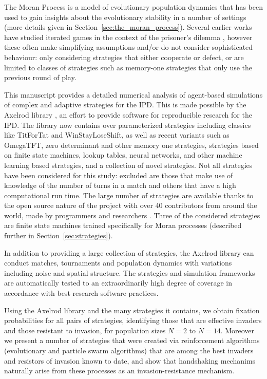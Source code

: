 \documentclass{article}
\begin{document}
The Moran Process \cite{Moran1957} is a model of
evolutionary population dynamics that has been used to gain insights about the
evolutionary stability in a number of settings (more details given in
Section~\ref{sec:the_moran_process}).
Several earlier
works have studied iterated games in the context of the prisoner's dilemma
\cite{Nowak, stewart2013extortion}, however these often make simplifying assumptions
and/or do not consider sophisticated behaviour: only considering strategies that
either cooperate or defect, or are limited to classes of strategies
such as memory-one strategies that only use the previous round of play.

This manuscript provides a detailed numerical analysis of agent-based simulations
of \textbf{}complex and adaptive strategies for the
IPD\@. This is made possible by the Axelrod library \cite{axelrodproject}, an
effort to provide software for reproducible research for the IPD\@. The library
now contains over parameterized
strategies including classics like TitForTat and WinStayLoseShift, as well as
recent variants such as OmegaTFT, zero determinant and other memory one
strategies, strategies based on finite state machines, lookup tables, neural
networks, and other machine learning based strategies, and a collection of novel
strategies. Not all strategies have been considered for this study: excluded
are those that make use of knowledge of the number of turns in a match
and others that have a high
computational run time. The large number of strategies are available thanks to
the open source nature of the project with over 40 contributors from around the
world, made by programmers and researchers \cite{Knight2016}. Three of the considered
strategies are finite state machines trained specifically for Moran processes
(described further in Section~\ref{sec:strategies}).

In addition to providing a large collection of strategies, the Axelrod library
can conduct matches, tournaments and population
dynamics with variations including noise and spatial structure.
The strategies and simulation frameworks are
automatically tested to an extraordinarily high degree of coverage in accordance
with best research software practices.

Using the Axelrod library and the many strategies it contains, we obtain
fixation probabilities for all pairs of strategies, identifying
those that are effective invaders and those resistant to invasion, for
population sizes $N=2$ to $N=14$. Moreover we present a number of strategies
that were created via reinforcement algorithms (evolutionary and particle
swarm algorithms) that are among the best invaders and resistors of invasion
known to date, and show that handshaking mechanims naturally arise from these
processes as an invasion-resistance mechanism.
\end{document}
